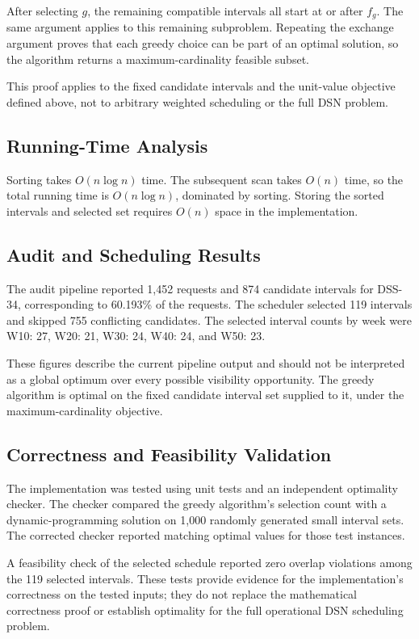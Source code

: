 \documentclass[conference]{IEEEtran}
\begin{document}
After selecting $g$, the remaining compatible intervals all start at
or after $f_g$. The same argument applies to this remaining subproblem.
Repeating the exchange argument proves that each greedy choice can be
part of an optimal solution, so the algorithm returns a
maximum-cardinality feasible subset.

This proof applies to the fixed candidate intervals and the
unit-value objective defined above, not to arbitrary weighted
scheduling or the full DSN problem.

\subsection{Running-Time Analysis}

Sorting takes $O(n\log n)$ time. The subsequent scan takes $O(n)$
time, so the total running time is $O(n\log n)$, dominated by sorting.
Storing the sorted intervals and selected set requires $O(n)$ space
in the implementation.

\subsection{Audit and Scheduling Results}

The audit pipeline reported 1,452 requests and 874 candidate intervals
for DSS-34, corresponding to 60.193\% of the requests. The scheduler
selected 119 intervals and skipped 755 conflicting candidates.
The selected interval counts by week were W10: 27, W20: 21, W30: 24,
W40: 24, and W50: 23.

These figures describe the current pipeline output and should not be
interpreted as a global optimum over every possible visibility
opportunity. The greedy algorithm is optimal on the fixed candidate
interval set supplied to it, under the maximum-cardinality objective.

\subsection{Correctness and Feasibility Validation}

The implementation was tested using unit tests and an independent
optimality checker. The checker compared the greedy algorithm's
selection count with a dynamic-programming solution on 1,000 randomly
generated small interval sets. The corrected checker reported matching
optimal values for those test instances.

A feasibility check of the selected schedule reported zero overlap
violations among the 119 selected intervals. These tests provide
evidence for the implementation's correctness on the tested inputs;
they do not replace the mathematical correctness proof or establish
optimality for the full operational DSN scheduling problem.
\end{document}
